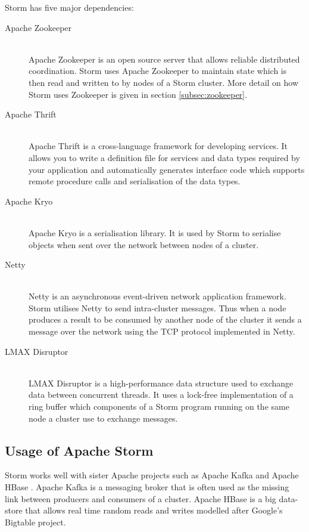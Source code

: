 Storm has five major dependencies:

\begin{description}
	\item[Apache Zookeeper] \hfill \\
	Apache Zookeeper \cite{ApacheZookeeper} is an open source server that allows reliable distributed coordination. Storm uses Apache Zookeeper to maintain state which is then read and written to by nodes of a Storm cluster. More detail on how Storm uses Zookeeper is given in section \ref{subsec:zookeeper}.
	\item[Apache Thrift] \hfill \\
	Apache Thrift \cite{ApacheThrift} is a cross-language framework for developing services. It allows you to write a definition file for services and data types required by your application and automatically generates interface code which supports remote procedure calls and serialisation of the data types.
	\item[Apache Kryo] \hfill \\
	Apache Kryo \cite{ApacheKryo} is a serialisation library. It is used by Storm to serialise objects when sent over the network between nodes of a cluster.
	\item[Netty] \hfill \\
	Netty \cite{Netty} is an asynchronous event-driven network application framework. Storm utilises Netty to send intra-cluster messages. Thus when a node produces a result to be consumed by another node of the cluster it sends a message over the network using the TCP protocol implemented in Netty.
	\item[LMAX Disruptor] \hfill \\
	LMAX Disruptor \cite{LMAXDisruptor} is a high-performance data structure used to exchange data between concurrent threads. It uses a lock-free implementation of a ring buffer which components of a Storm program running on the same node a cluster use to exchange messages.
\end{description}

\subsection{Usage of Apache Storm}

Storm works well with sister Apache projects such as Apache Kafka \cite{ApacheKafka} and Apache HBase \cite{ApacheHBase}. Apache Kafka is a messaging broker that is often used as the missing link between producers and consumers of a cluster. Apache HBase is a big data-store that allows real time random reads and writes modelled after Google's Bigtable project. \cite{Bigtable}

